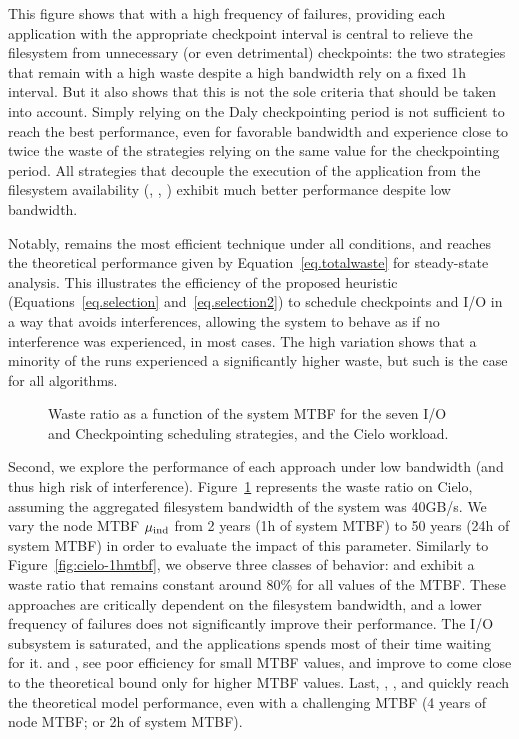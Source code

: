This figure shows that with a high frequency of failures, providing
each application with the appropriate checkpoint interval is central
to relieve the filesystem from unnecessary (or even detrimental)
checkpoints: the two strategies that remain with a high waste despite
a high bandwidth rely on a fixed 1h interval.
But it also shows that this is not the sole criteria that should be taken
into account. Simply relying on the Daly checkpointing period is not
sufficient to reach the best performance, even for favorable bandwidth
\propdaly and \bfifodaly experience close to
twice the waste of the strategies relying on the same value for
the checkpointing period. All strategies that decouple the execution
of the application from the filesystem availability (\fifodaly,
\fifofixed, \cooperative) exhibit much better performance despite low
bandwidth.

Notably, \cooperative remains the most efficient technique under all
conditions, and reaches the theoretical performance given by
Equation~\eqref{eq.totalwaste} for steady-state analysis. This
illustrates the efficiency of the proposed heuristic
(Equations~\eqref{eq.selection} and~\eqref{eq.selection2}) to schedule
checkpoints and I/O in a way that avoids interferences, allowing the
system to behave as if no interference was experienced, in most
cases. The high variation shows that a minority of the runs
experienced a significantly higher waste, but such is the case for
all algorithms.

\begin{figure}
  \begin{center}
    \resizebox{\linewidth}{!}{}
  \end{center}
  \caption{Waste ratio as a function of the system MTBF for the
    seven I/O and Checkpointing scheduling strategies, and the Cielo
    workload. \label{fig:cielo-40gbs}}
\end{figure}

Second, we explore the performance of each approach under low
bandwidth (and thus high risk of interference).
Figure~\ref{fig:cielo-40gbs} represents the waste ratio on Cielo,
assuming the aggregated filesystem bandwidth of the system was
40GB/s. We vary the node MTBF $\mu_{\text{ind}}$ from 2 years (1h of system
MTBF) to 50 years (24h of system MTBF) in order to evaluate the impact
of this parameter. Similarly to Figure~\ref{fig:cielo-1hmtbf}, we
observe three classes of behavior: \propfixed and \bfifofixed exhibit
a waste ratio that remains constant around 80\% for all values of the
MTBF. These approaches are critically dependent on the filesystem
bandwidth, and a lower frequency of failures does not significantly
improve their performance. The I/O subsystem is saturated, and the
applications spends most of their time waiting for it.
%
\propdaly and \bfifodaly, see poor efficiency for small MTBF values,
and improve to come close to the theoretical bound only for higher
MTBF values. Last, \fifodaly,
\fifofixed, and \cooperative quickly reach the theoretical model
performance, even with a challenging MTBF (4 years of node MTBF; or 2h of
system MTBF).

